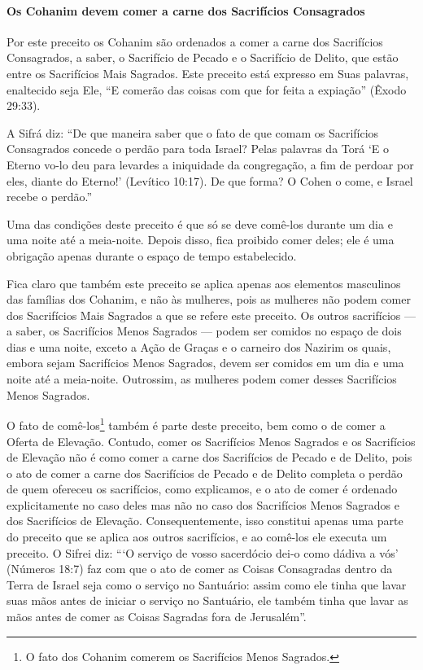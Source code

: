 \paragraph{Os Cohanim devem comer a carne dos Sacrifícios Consagrados}

Por este preceito os Cohanim são ordenados a comer a carne dos
Sacrifícios Consagrados, a saber, o Sacrifício de Pecado e o Sacrifício
de Delito, que estão entre os Sacrifícios Mais Sagrados. Este preceito
está expresso em Suas palavras, enaltecido seja Ele, ``E comerão das
coisas com que for feita a expiação'' (Êxodo 29:33).

A Sifrá diz: ``De que maneira saber que o fato de que comam os
Sacrifícios Consagrados concede o perdão para toda Israel? Pelas
palavras da Torá `E o Eterno vo-lo deu para levardes a iniquidade da
congregação, a fim de perdoar por eles, diante do Eterno!' (Levítico
10:17). De que forma? O Cohen o come, e Israel recebe o perdão.''

Uma das condições deste preceito é que só se deve comê-los durante um
dia e uma noite até a meia-noite. Depois disso, fica proibido comer
deles; ele é uma obrigação apenas durante o espaço de tempo
estabelecido.

Fica claro que também este preceito se aplica apenas aos elementos
masculinos das famílias dos Cohanim, e não às mulheres, pois as
mulheres não podem comer dos Sacrifícios Mais Sagrados a que se refere
este preceito. Os outros sacrifícios --- a saber, os Sacrifícios Menos
Sagrados --- podem ser comidos no espaço de dois dias e uma noite,
exceto a Ação de Graças e o carneiro dos Nazirim os quais, embora sejam
Sacrifícios Menos Sagrados, devem ser comidos em um dia e uma noite até
a meia-noite. Outrossim, as mulheres podem comer desses Sacrifícios
Menos Sagrados.

O fato de comê-los\footnote{O fato dos Cohanim comerem os Sacrifícios Menos Sagrados.} também é parte deste preceito,
bem como o de comer a Oferta de Elevação. Contudo, comer os Sacrifícios
Menos Sagrados e os Sacrifícios de Elevação não é como comer a carne dos
Sacrifícios de Pecado e de Delito, pois o ato de comer a carne dos
Sacrifícios de Pecado e de Delito completa o perdão de quem ofereceu os
sacrifícios, como explicamos, e o ato de comer é ordenado explicitamente
no caso deles mas não no caso dos Sacrifícios Menos Sagrados e dos Sacrifícios de Elevação.
Consequentemente, isso constitui apenas uma parte do preceito que se
aplica aos outros sacrifícios, e ao comê-los ele executa um preceito. O
Sifrei diz: ```O serviço de vosso sacerdócio dei-o como dádiva a vós'
(Números 18:7) faz com que o ato de comer as Coisas Consagradas dentro
da Terra de Israel seja como o serviço no Santuário: assim como ele
tinha que lavar suas mãos antes de iniciar o serviço no Santuário, ele
também tinha que lavar as mãos antes de comer as Coisas Sagradas fora de
Jerusalém''.

